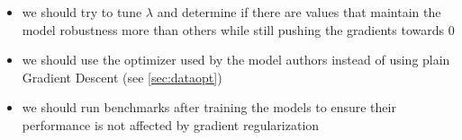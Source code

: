 \documentclass[11pt]{article}
\begin{document}
\begin{itemize}
    \item we should try to tune $\lambda$ and determine if there are values that maintain the model robustness more than others while still pushing the gradients towards $0$
    \item we should use the optimizer used by the model authors instead of using plain Gradient Descent (see \cref{sec:dataopt})
    \item we should run benchmarks after training the models to ensure their performance is not affected by gradient regularization
\end{itemize}

%

\end{document}
